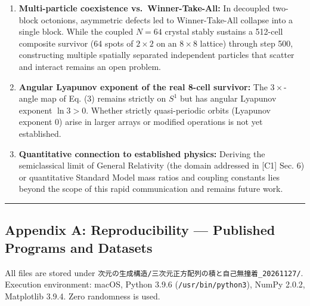 \documentclass[
  a4paper,
]{article}
\providecommand{\tightlist}{%
  \setlength{\itemsep}{0pt}\setlength{\parskip}{0pt}}
\begin{document}
\begin{enumerate}
\def\labelenumi{\arabic{enumi}.}
\tightlist
\item
  \textbf{Multi-particle coexistence vs.~Winner-Take-All:} In decoupled
  two-block octonions, asymmetric defects led to Winner-Take-All
  collapse into a single block. While the coupled \(N = 64\) crystal
  stably sustains a 512-cell composite survivor (64 spots of
  \(2 \times 2\) on an \(8 \times 8\) lattice) through step 500,
  constructing multiple spatially separated independent particles that
  scatter and interact remains an open problem.
\item
  \textbf{Angular Lyapunov exponent of the real 8-cell survivor:} The
  \(3\times\)-angle map of Eq. (3) remains strictly on \(S^1\) but has
  angular Lyapunov exponent \(\ln 3 > 0\). Whether strictly
  quasi-periodic orbits (Lyapunov exponent \(0\)) arise in larger arrays
  or modified operations is not yet established.
\item
  \textbf{Quantitative connection to established physics:} Deriving the
  semiclassical limit of General Relativity (the domain addressed in
  {[}C1{]} Sec. 6) or quantitative Standard Model mass ratios and
  coupling constants lies beyond the scope of this rapid communication
  and remains future work.
\end{enumerate}

\begin{center}\rule{0.5\linewidth}{0.5pt}\end{center}

\subsection{Appendix A: Reproducibility --- Published Programs and
Datasets}\label{appendix-a-reproducibility-published-programs-and-datasets}

All files are stored under
\texttt{次元の生成構造/\allowbreak{}三次元正方配列の積と自己無撞着\_\allowbreak{}20261127/\allowbreak{}}.
Execution environment: macOS, Python 3.9.6 (\texttt{/\allowbreak{}usr/\allowbreak{}bin/\allowbreak{}python3}),
NumPy 2.0.2, Matplotlib 3.9.4. Zero randomness is used.
\end{document}
